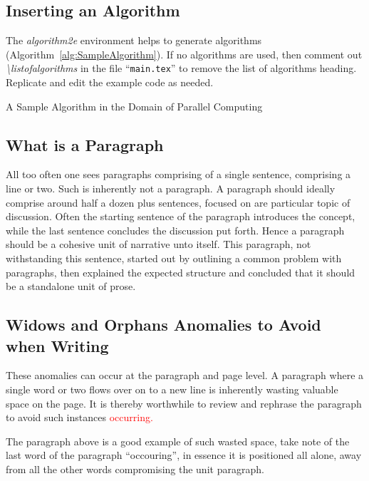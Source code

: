 \subsection{Inserting an Algorithm}
The \emph{algorithm2e} environment \cite{online:Fiorio2016algorithm2e} helps to generate algorithms (Algorithm~\ref{alg:SampleAlgorithm}). If no algorithms are used, then comment out \emph{\textbackslash listofalgorithms } in the file ``{\tt main.tex}'' to remove the list of algorithms heading. Replicate and edit the example code as needed.

\begin{algorithm}
{}
\caption{A Sample Algorithm in the Domain of Parallel Computing} \label{alg:SampleAlgorithm}
\end{algorithm}

\subsection{What is a Paragraph}
All too often one sees paragraphs comprising of a single sentence, comprising a line or two. Such is inherently not a paragraph. A paragraph should ideally comprise around half a dozen plus sentences, focused on are particular topic of discussion. Often the starting sentence of the paragraph introduces the concept, while the last sentence concludes the discussion put forth. Hence a paragraph should be a cohesive unit of narrative unto itself. This paragraph, not withstanding this sentence, started out by outlining a common problem with paragraphs, then explained the expected structure and concluded that it should be a standalone unit of prose. 

\subsection{Widows and Orphans Anomalies to Avoid when Writing}
These anomalies can occur at the paragraph and page level. A paragraph where a single word or two flows over on to a new line is inherently wasting valuable space on the page. It is thereby worthwhile to review and rephrase the paragraph to avoid such instances \textcolor{red}{occurring.}  

The paragraph above is a good example of such wasted space, take note of the last word of the paragraph ``occouring'', in essence it is positioned all alone, away from all the other words compromising the unit paragraph. 

